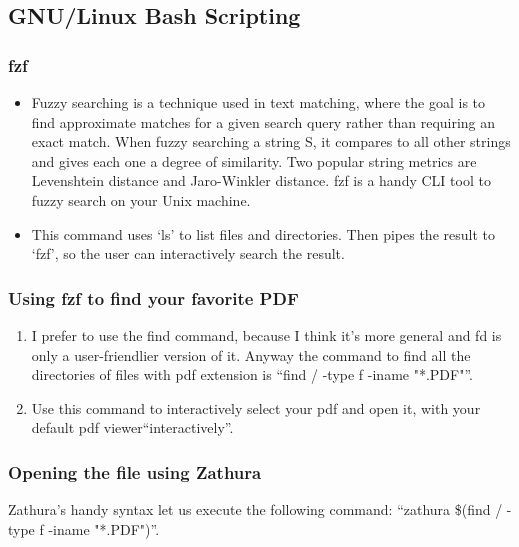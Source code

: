 \documentclass[12pt]{article}
\begin{document}
\subsection{GNU/Linux Bash Scripting}
\subsubsection{fzf}
\begin{itemize}
    \item Fuzzy searching is a technique used in text matching, where the goal is to find approximate matches for a given search query rather than requiring an exact match. When fuzzy searching a string S, it compares to all other strings and gives each one a degree of similarity. Two popular string metrics are Levenshtein distance and Jaro-Winkler distance. fzf is a handy CLI tool to fuzzy search on your Unix machine.
    \item This command uses `ls' to list files and directories. Then pipes the result to `fzf', so the user can interactively search the result.
\end{itemize}

\subsubsection{Using fzf to find your favorite PDF}
\begin{enumerate}
    \item I prefer to use the find command, because I think it's more general and fd is only a user-friendlier version of it. Anyway the command to find all the directories of files with pdf extension is ``find / -type f -iname "*.PDF"''.
    \item Use this command to interactively select your pdf and open it, with your default pdf viewer``interactively''.
\end{enumerate}

\subsubsection{Opening the file using Zathura}
Zathura's handy syntax let us execute the following command: \newline``zathura \$(find / -type f -iname "*.PDF")''.
\end{document}
